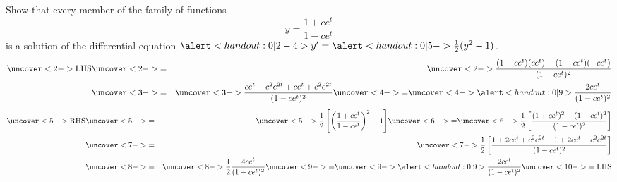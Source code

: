 \begin{frame}
\begin{example}[Example 1, p. 606]
Show that every member of the family of functions 
\abovedisplayskip=0pt
\belowdisplayskip=0pt
\[
y = \frac{1 + ce^t}{1-ce^t}
\]
is a solution of the differential equation $\alert<handout:0| 2-4>{y'} = \alert<handout:0| 5->{\frac{1}{2} (y^2 - 1)}$.
\abovedisplayskip=0pt
\belowdisplayskip=0pt
\begin{eqnarray*}
\uncover<2->{%
\textrm{LHS} %
}%
& \uncover<2->{ = } &%
\uncover<2->{%
\frac{(1-ce^t)(ce^t) - (1+ce^t)(-ce^t)}{(1-ce^t)^2}%
}\\%
& \uncover<3->{ = } &%
\uncover<3->{%
\frac{ce^t - c^2 e^{2t} + ce^t + c^2 e^{2t}}{(1-ce^t)^2}%
}  \uncover<4->{ = } \uncover<4->{%
\alert<handout:0| 9>{\frac{2ce^t}{(1-ce^t)^2}}%
}\\%
\end{eqnarray*}
\abovedisplayskip=0pt
\belowdisplayskip=0pt
\begin{eqnarray*}
\uncover<5->{%
\textrm{RHS} %
} 
& \uncover<5->{ = } & 
\uncover<5->{%
\frac{1}{2}\left[ \left( \frac{1+ce^t}{1-ce^t}\right)^2 - 1\right]
} \uncover<6->{ = } \uncover<6->{%
\frac{1}{2}\left[  \frac{(1+ce^t)^2 - (1-ce^t)^2}{(1-ce^t)^2} \right]
}\\ 
& \uncover<7->{ = } &
\uncover<7->{%
\frac{1}{2}\left[  \frac{1+2ce^t +c^2e^{2t} - 1 + 2ce^t - c^2e^{2t}}{(1-ce^t)^2} \right]
}\\
 & \uncover<8->{ = } & %
\uncover<8->{%
\frac{1}{2}  \frac{4ce^t }{(1-ce^t)^2} 
} \uncover<9->{ = } \uncover<9->{%
  \alert<handout:0| 9>{\frac{2ce^t }{(1-ce^t)^2}} \uncover<10->{= \textrm{LHS}}
}\\%
\end{eqnarray*}
\end{example}
\end{frame}
